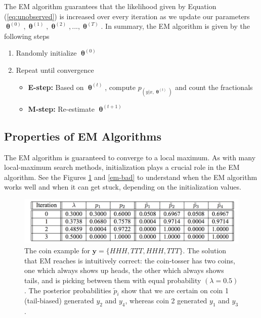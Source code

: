 \documentclass[justified, marginals=justified]{tufte-handout}
\theoremstyle{definition}
\begin{document}
The EM algorithm guarantees that the likelihood given by Equation (\ref{eq:unobserved}) is increased over every iteration as we update our parameters $\bm{\uptheta}^{(0)}, \bm{\uptheta}^{(1)}, 
\bm{\uptheta}^{(2)}, ..., \bm{\uptheta}^{(T)}$. In summary, the EM algorithm is given by the following steps

\begin{enumerate}
	\item
	Randomly initialize $\bm{\uptheta}^{(0)}$
	\item
	Repeat until convergence
	\begin{itemize}
		\item \textbf{E-step:} Based on $\bm{\uptheta}^{(t)}$, compute $p_(y|x, \bm{\uptheta}^{(t)})$ and count the fractionals
		\item \textbf{M-step:} Re-estimate $\bm{\uptheta}^{(t+1)}$
	\end{itemize}
\end{enumerate}

\subsection{Properties of EM Algorithms}

The EM algorithm is guaranteed to converge to a local maximum. As with many local-maximum search methods, initialization plays a crucial role in the EM algorithm. See the Figures \ref{em-good} and \ref{em-bad} to understand when the EM algorithm works well and when it can get stuck, depending on the initialization values.

\begin{figure}
	\includegraphics[width=\linewidth]{em-good.png}
	\caption{The coin example for $\mathbf{y} = \{HHH, TTT, HHH, TTT\}$. The solution that EM reaches is intuitively correct: the coin-tosser has two coins, one which always shows up heads, the other which always shows tails, and is picking between them with equal probability $(\lambda = 0.5)$. The posterior probabilities $\tilde{p}_i$ show that we are certain on coin 1 (tail-biased) generated $y_2$ and $y_4$, whereas coin 2 generated $y_1$ and $y_3$.} 
	\label{em-good}
	\centering
\end{figure}
\end{document}
